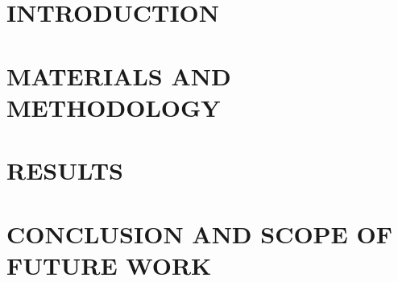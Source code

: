 \documentclass[12pt,twoside]{report}
\title{\thesistitle}
\begin{document}

\titleformat{\chapter}[display]{\bfseries\centering}{\large}{1em}{\large}
\newpage

\chapter{INTRODUCTION}
\setcounter{page}{1}


\chapter{MATERIALS AND METHODOLOGY}


\chapter{RESULTS}

\chapter{CONCLUSION AND SCOPE OF FUTURE WORK}

\end{document}
